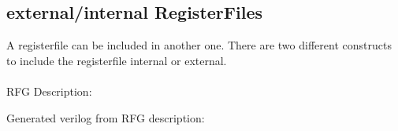 \documentclass[12pt,a4paper]{article}
\begin{document}
\subsection{external/internal RegisterFiles}
A registerfile can be included in another one. There are two different constructs to include the registerfile internal or external.\\
\\
RFG Description:

\newpage
Generated verilog from RFG description:

\newpage
\end{document}
